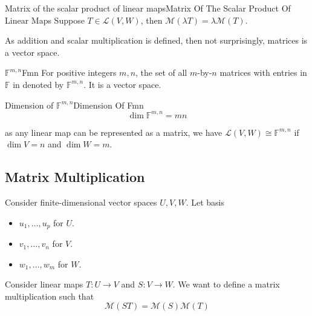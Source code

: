 \documentclass[../main.tex]{subfiles}
\begin{document}
\begin{theorem}{Matrix of the scalar product of linear maps}{Matrix Of The Scalar Product Of Linear Maps}
Suppose $T\in \mathscr{L}(V,W)$, then $\mathscr{M}(\lambda T) = \lambda \mathscr{M}(T)$.
\end{theorem}

As addition and scalar multiplication is defined, then not surprisingly, matrices is a vector space.
\begin{notation}{$\mathbb{F}^{m,n}$}{Fmn}
For positive integers $m,n$, the set of all $m$-by-$n$ matrices with entries in $\mathbb{F}$ in denoted by $\mathbb{F}^{m,n}$. It is a vector space.
\end{notation}
\begin{theorem}{Dimension of $\mathbb{F}^{m,n}$}{Dimension Of Fmn}
\begin{equation}
\dim \mathbb{F}^{m,n} = mn
\end{equation}
\end{theorem}
\begin{remark}
as any linear map can be represented as a matrix, we have $\mathscr{L}(V,W)\cong \mathbb{F}^{m,n}$ if $\dim V=n$ and $\dim W=m$.
\end{remark}

\subsection{Matrix Multiplication}

Consider finite-dimensional vector spaces $U,V,W$. Let basis
\begin{itemize}
\item $u_1, \ldots ,u_p$ for $U$.
\item $v_1, \ldots ,v_n$ for $V$.
\item $w_1, \ldots ,w_m$ for $W$.
\end{itemize}
Consider linear maps $T: U \rightarrow V$ and $S: V \rightarrow  W$. We want to define a matrix multiplication such that
\begin{equation*}
\mathscr{M}(ST) = \mathscr{M}(S)\mathscr{M}(T)
\end{equation*}
\end{document}
